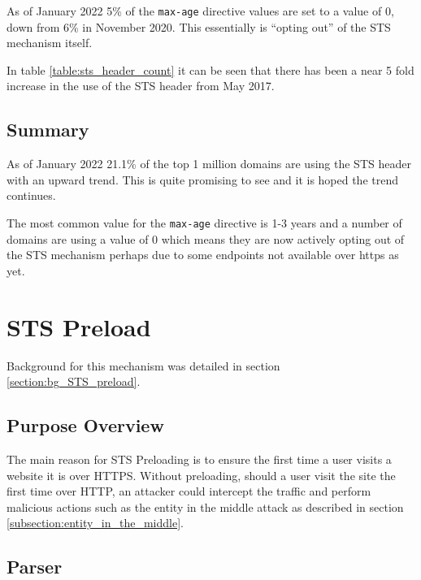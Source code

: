 \documentclass{mscreport}
\begin{document}
\vspace{0.3cm} \noindent
As of January 2022 5\% of the \texttt{max-age} directive values are set to a value of 0, down from 6\% in November 2020. This essentially is ``opting out'' of the STS mechanism itself.

\vspace{0.3cm} \noindent
In table \ref{table:sts_header_count} it can be seen that there has been a near 5 fold increase in the use of the STS header from May 2017.

\subsection{Summary}

\noindent
As of January 2022 21.1\% of the top 1 million domains are using the STS header with an upward trend. This is quite promising to see and it is hoped the trend continues.


\vspace{0.3cm} \noindent
The most common value for the \texttt{max-age} directive is 1-3 years and a number of domains are using a value of 0 which means they are now actively opting out of the STS mechanism perhaps due to some endpoints not available over https as yet.


\clearpage
\newpage

\section{STS Preload}
\label{section:ana_STS_preload}

Background for this mechanism was detailed in section \ref{section:bg_STS_preload}.

\subsection{Purpose Overview}

\noindent
The main reason for STS Preloading is to ensure the first time a user visits a website it is over HTTPS. Without preloading, should a user visit the site the first time over HTTP, an attacker could intercept the traffic and perform malicious actions such as the entity in the middle attack as described in section \ref{subsection:entity_in_the_middle}.

\subsection{Parser}
\end{document}
